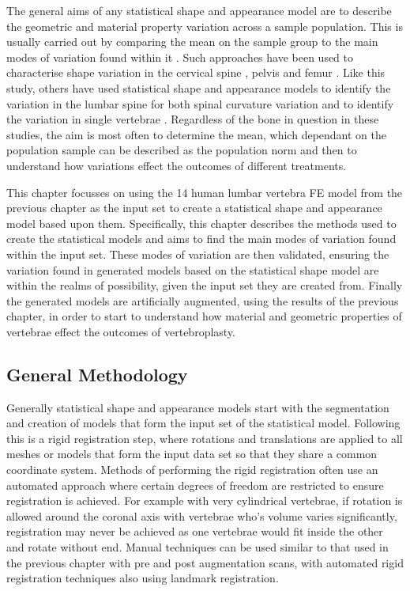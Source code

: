 The general aims of any statistical shape and appearance model are to describe
the geometric and material property variation across a sample population. This
is usually carried out by comparing the mean on the sample group to the main
modes of variation found within it \cite{clogenson2015statistical}. Such
approaches have been used to characterise shape variation in the cervical spine
\cite{bredbenner2014development}, pelvis \cite{meller2004building} and femur
\cite{nicolella2012development,bryan2010statistical}. Like this study, others
have used statistical shape and appearance models to identify the variation in
the lumbar spine for both spinal curvature variation
\cite{ali2012accuracy,meakin2009intrinsic,boisvert2008geometric} and to
identify the variation in single vertebrae
\cite{hollenbeck2018statistical,clogenson2015statistical}. Regardless of the
bone in question in these studies, the aim is most often to determine the mean,
which dependant on the population sample can be described as the population
norm and then to understand how variations effect the outcomes of different
treatments.

This chapter focusses on using the 14 human lumbar vertebra FE model from the
previous chapter as the input set to create a statistical shape and appearance
model based upon them. Specifically, this chapter describes the methods used to
create the statistical models and aims to find the main modes of variation
found within the input set. These modes of variation are then validated,
ensuring the variation found in generated models based on the statistical shape
model are within the realms of possibility, given the input set they are
created from. Finally the generated models are artificially augmented, using
the results of the previous chapter, in order to start to understand how
material and geometric properties of vertebrae effect the outcomes of
vertebroplasty.

\subsection{General Methodology}

Generally statistical shape and appearance models start with the segmentation
and creation of models that form the input set of the statistical model.
Following this is a rigid registration step, where rotations and translations
are applied to all meshes or models that form the input data set so that they
share a common coordinate system. Methods of performing the rigid registration
often use an automated approach where certain degrees of freedom are restricted
to ensure registration is achieved. For example with very cylindrical
vertebrae, if rotation is allowed around the coronal axis with vertebrae who's
volume varies significantly, registration may never be achieved as one
vertebrae would fit inside the other and rotate without end. Manual techniques
can be used similar to that used in the previous chapter with pre and post
augmentation scans, with automated rigid registration techniques also using
landmark registration.

